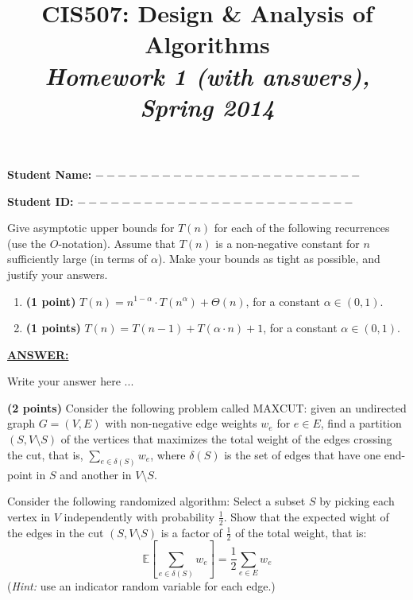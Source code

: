 \documentclass{article}
\begin{document}
\title{CIS507: Design \& Analysis of Algorithms\\\emph{Homework 1 (with answers), Spring 2014}}


\date{}

\maketitle
\textbf{Student Name:} $------------------------$

\vspace{0.2in}

\textbf{Student ID:} $-------------------------$

\vspace{0.2in}


Give asymptotic upper bounds for $T(n)$ for each of the following
recurrences  (use the $O$-notation). Assume that $T(n)$ is a
non-negative constant for $n$ sufficiently large (in terms of
$\alpha$). Make your bounds as tight as possible, and justify your
answers. 

\begin{enumerate}
\item  \textbf{(1 point)} $T(n)=n^{1-\alpha}\cdot
  T(n^{\alpha})+\Theta(n)$, for a constant $\alpha\in (0,1)$.   
\item  \textbf{(1 points)} $T(n)= T(n-1)+T(\alpha\cdot n)+1$, for a
  constant $\alpha\in (0,1)$. 
\end{enumerate}
\noindent \underline{\textbf{ANSWER:}}

Write your answer here ...


\medskip 

\textbf{(2 points)}
Consider the following problem called MAXCUT: given an undirected
graph $G=(V,E)$ with non-negative edge weights $w_e$ for $e\in E$,
find a partition $(S,V\setminus S)$ of the vertices that maximizes the
total weight of the edges crossing the cut, that is,
$\sum_{e\in\delta(S)}w_{e}$, where $\delta(S)$ is the set of edges
that have one end-point in $S$ and another in $V\setminus S$.     

Consider the following randomized algorithm: Select a subset $S$ by
picking each vertex in $V$ independently with probability
$\frac{1}{2}$. Show that the expected wight of the edges in the cut
$(S,V\setminus S)$ is a factor of $\frac{1}{2}$ of the total weight,
that is: $$\mathbb{E}\left[\sum_{e\in\delta(S)}w_{e}\right]=
\frac{1}{2}\sum_{e\in E}w_e$$ ({\it Hint:} use an indicator random
variable for each edge.)  
 
\end{document}

